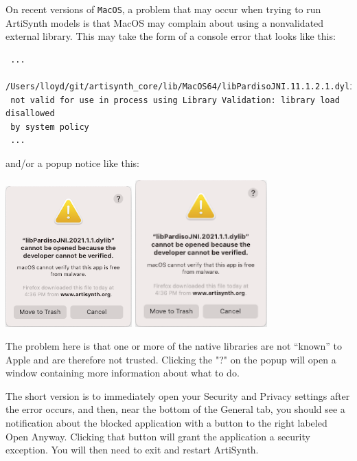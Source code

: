 \begin{sideblock}
On recent versions of {\tt MacOS}, a problem that may occur when trying to run
ArtiSynth models is that MacOS may complain about using a nonvalidated external
library. This may take the form of a console error that looks like this:
\begin{verbatim}
 ...
 /Users/lloyd/git/artisynth_core/lib/MacOS64/libPardisoJNI.11.1.2.1.dylib)
 not valid for use in process using Library Validation: library load disallowed
 by system policy 
 ...
\end{verbatim}
and/or a popup notice like this:
\begin{center}
\iflatexml
  \includegraphics[]{images/MacSecurityNotice}
\else
  \includegraphics[width=2in]{images/MacSecurityNotice}
\fi
\end{center}
The problem here is that one or more of the native libraries are not ``known''
to Apple and are therefore not trusted. Clicking the "?" on the popup will
open a window containing more information about what to do.

The short version is to immediately open your Security and Privacy
settings after the error occurs, and then, near the bottom of the {\sf
General} tab, you should see a notification about the blocked
application with a button to the right labeled {\sf Open
Anyway}. Clicking that button will grant the application a security
exception. You will then need to exit and restart ArtiSynth.
\end{sideblock}

